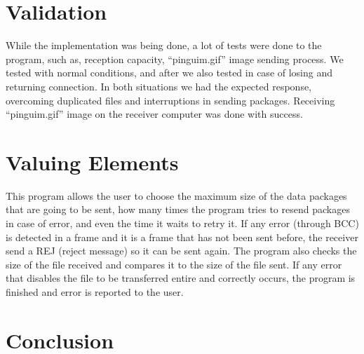\documentclass[a4paper]{article}
\begin{document}
\section{Validation}

While the implementation was being done, a lot of tests were done to the program, such as, reception capacity, “pinguim.gif” image sending process. We tested with normal conditions, and after we also tested in case of losing and returning connection. In both situations we had the expected response, overcoming duplicated files and
interruptions in sending packages. Receiving “pinguim.gif” image on the receiver computer was done with success.

\section{Valuing Elements}

This program allows the user to choose the maximum size of the data packages that are going to be sent, how many times the program tries to resend packages in case of error, and even the time it waits to retry it. If any error (through BCC) is detected in a frame and it is a frame that has not been sent before, the receiver send a REJ (reject message) so it can be sent again. The program also checks the size of the file received and compares it to the size of the file sent. If any error that disables the file to be transferred entire and correctly occurs, the program is finished and error is reported to the user.

\section{Conclusion}
\end{document}
